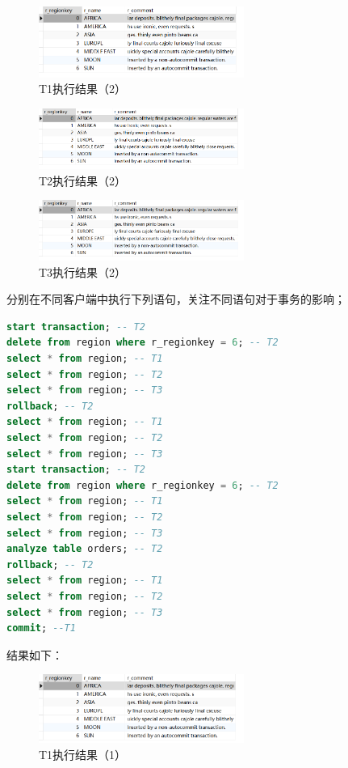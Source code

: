 \documentclass{article}
\begin{document}
\begin{figure}[H]
  \centering
  \includegraphics[width=0.6\textwidth]{img/10.png}
  \caption{T1执行结果（2）}
\end{figure}

\begin{figure}[H]
  \centering
  \includegraphics[width=0.6\textwidth]{img/11.png}
  \caption{T2执行结果（2）}
\end{figure}

\begin{figure}[H]
  \centering
  \includegraphics[width=0.6\textwidth]{img/12.png}
  \caption{T3执行结果（2）}
\end{figure}

分别在不同客户端中执行下列语句，关注不同语句对于事务的影响；

\begin{lstlisting}[language=sql]
start transaction; -- T2
delete from region where r_regionkey = 6; -- T2
select * from region; -- T1
select * from region; -- T2
select * from region; -- T3
rollback; -- T2
select * from region; -- T1
select * from region; -- T2
select * from region; -- T3
start transaction; -- T2
delete from region where r_regionkey = 6; -- T2
select * from region; -- T1
select * from region; -- T2
select * from region; -- T3
analyze table orders; -- T2
rollback; -- T2
select * from region; -- T1
select * from region; -- T2
select * from region; -- T3
commit; --T1
\end{lstlisting}

结果如下：

\begin{figure}[H]
  \centering
  \includegraphics[width=0.6\textwidth]{img/13.png}
  \caption{T1执行结果（1）}
\end{figure}
\end{document}
